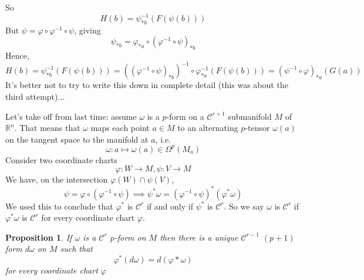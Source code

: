 \documentclass{article}
\newtheorem{proposition}{Proposition}
\newcommand{\reals}[0]{\mathbb{R}}
\newcommand{\mc}[1]{\mathcal{#1}}
\begin{document}
So
\begin{equation}
  H(b) = \psi_{*b}^{-1}(F(\psi(b)))
\end{equation}
But \(\psi = \varphi \circ \varphi^{-1} \circ \psi\), giving
\begin{equation}
  \psi_{*b} = \varphi_{*a} \circ (\varphi^{-1} \circ \psi)_{*b}
\end{equation}
Hence,
\begin{equation}
  H(b) = \psi_{*b}^{-1}(F(\psi(b))) = ((\varphi^{-1} \circ \psi)_{*b})^{-1} \circ \varphi^{-1}_{*a}(F(\psi(b))) = (\psi^{-1} \circ \varphi)_{*a}(G(a))
\end{equation}
It's better not to try to write this down in complete detail (this was about the third attempt)...


Let's take off from last time: assume \(\omega\) is a \(p\)-form on a \(\mc{C}^{r+1}\) submanifold \(M\) of \(\reals^n\). That means that \(\omega\) maps each point \(a \in M\) to an alternating \(p\)-tensor \(\omega(a)\) on the tangent space to the manifold at \(a\), i.e.
\begin{equation}\omega : a \mapsto \omega(a) \in \Omega^p(M_a)\end{equation}
Consider two coordinate charts
\begin{equation}\varphi: W \to M, \psi: V \to M\end{equation}
We have, on the intersection \(\varphi(W) \cap \psi(V)\),
\begin{equation}\psi = \varphi \circ (\varphi^{-1} \circ \psi) \implies \psi^*\omega = (\varphi^{-1} \circ \psi)^*(\varphi^*\omega)\end{equation}
We used this to conclude that \(\varphi^*\) is \(\mc{C}^r\) if and only if \(\psi^*\) is \(\mc{C}^r\). So we say \(\omega\) is \(\mc{C}^r\) if \(\varphi^*\omega\) is \(\mc{C}^r\) for every coordinate chart \(\varphi\).
\begin{proposition}
  If \(\omega\) is a \(\mc{C}^r\) \(p\)-form on \(M\) then there is a unique \(\mc{C}^{r - 1}\) \((p + 1)\) form \(d\omega\) on \(M\) such that
  \begin{equation}
    \varphi^*(d\omega) = d(\varphi*\omega)
  \end{equation}
  for every coordinate chart \(\varphi\)
\end{proposition}
\end{document}
